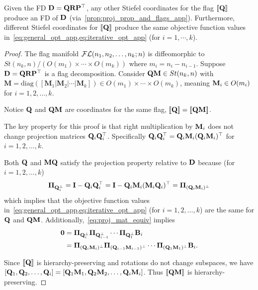\begin{prop}
    Given the FD $\mathbf{D} = \mathbf{Q} \mathbf{R} \mathbf{P}^\top$, any other Stiefel coordinates for the flag $[\![\mathbf{Q}]\!]$ produce an FD of $\mathbf{D}$ (via~\cref{prop:proj_prop_and_flags_app}). Furthermore, different Stiefel coordinates for $[\![\mathbf{Q}]\!]$ produce the same objective function values in~\cref{eq:general_opt_app,eq:iterative_opt_app} (for $i=1,\cdots,k$).
\end{prop}
\begin{proof}
    The flag manifold $\mathcal{FL}(n_1,n_2,\dots,n_k;n)$ is diffeomorphic to $St(n_k,n)/(O(m_1)\times \cdots \times O(m_k))$ where $m_i = n_i - n_{i-1}$. Suppose $\mathbf{D} = \mathbf{Q} \mathbf{R} \mathbf{P}^\top$ is a flag decomposition. Consider $\mathbf{Q} \mathbf{M} \in St(n_k,n)$ with $\mathbf{M} = \mathrm{diag}([\mathbf{M}_1|\mathbf{M}_2|\cdots | \mathbf{M}_k]) \in O(m_1)\times \cdots \times O(m_k)$, meaning $\mathbf{M}_i \in O(m_i)$ for $i=1,2,\dots,k$. 
    
    Notice $\mathbf{Q}$ and $\mathbf{Q} \mathbf{M}$ are coordinates for the same flag, $[\![\mathbf{Q}]\!]=[\![\mathbf{Q}\mathbf{M}]\!]$. 
    
    The key property for this proof is that right multiplication by $\mathbf{M}_i$ does not change projection matrices $\mathbf{Q}_i\mathbf{Q}_i^\top$. Specifically $\mathbf{Q}_i \mathbf{Q}_i^\top = \mathbf{Q}_i\mathbf{M}_i (\mathbf{Q}_i\mathbf{M}_i)^\top$ for $i=1,2,\dots,k$. 
    
    Both $\mathbf{Q}$ and $\mathbf{M}\mathbf{Q}$ satisfy the projection property relative to $\mathbf{D}$ because (for $i=1,2,\dots,k$)
    \begin{equation}\label{eq:proj_mat_equiv}
    \boldsymbol{\Pi}_{\mathbf{Q}_i^\perp} = \mathbf{I} - \mathbf{Q}_i \mathbf{Q}_i^\top = \mathbf{I} - \mathbf{Q}_i \mathbf{M}_i (\mathbf{M}_i \mathbf{Q}_i)^\top = \boldsymbol{\Pi}_{(\mathbf{Q}_i\mathbf{M}_i)^\perp}
    \end{equation}
    which implies that the objective function values in~\cref{eq:general_opt_app,eq:iterative_opt_app} (for $i=1,2,\dots,k$) are the same for $\mathbf{Q}$ and $\mathbf{Q}\mathbf{M}$. Additionally,~\cref{eq:proj_mat_equiv} implies
    \begin{align}
        \bm{0} &=\boldsymbol{\Pi}_{\mathbf{Q}_i^\perp}\boldsymbol{\Pi}_{\mathbf{Q}_{i-1}^\perp}\cdots \boldsymbol{\Pi}_{\mathbf{Q}_1^\perp} \mathbf{B}_i \\
        &= \boldsymbol{\Pi}_{(\mathbf{Q}_i\mathbf{M}_i)^\perp}\boldsymbol{\Pi}_{(\mathbf{Q}_{i-1}\mathbf{M}_{i-1})^\perp}\cdots \boldsymbol{\Pi}_{(\mathbf{Q}_1\mathbf{M}_1)^\perp} \mathbf{B}_i.
    \end{align}
    
    Since $[\![\mathbf{Q}]\!]$ is hierarchy-preserving and rotations do not change subspaces, we have $[\mathbf{Q}_1,\mathbf{Q}_2, \dots, \mathbf{Q}_i] = [\mathbf{Q}_1\mathbf{M}_1,\mathbf{Q}_2\mathbf{M}_2,\dots,\mathbf{Q}_i \mathbf{M}_i]$. Thus $[\![\mathbf{Q} \mathbf{M}]\!]$ is hierarchy-preserving.
    

\end{proof}
